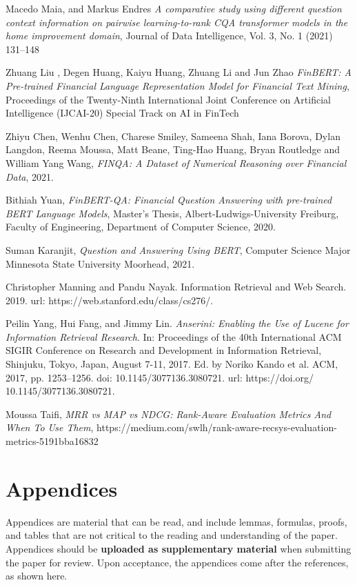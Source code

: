 \documentclass[11pt,a4paper]{article}
\begin{document}
\begin{thebibliography}{}

 Macedo Maia, and Markus Endres \emph{A comparative study using different question context information on pairwise learning-to-rank CQA transformer models in the home improvement domain}, Journal of Data Intelligence, Vol. 3, No. 1 (2021) 131–148

 Zhuang Liu , Degen Huang, Kaiyu Huang, Zhuang Li and Jun Zhao \emph{FinBERT: A Pre-trained Financial Language Representation Model for Financial Text Mining}, Proceedings of the Twenty-Ninth International Joint Conference on Artificial Intelligence (IJCAI-20) Special Track on AI in FinTech

 Zhiyu Chen, Wenhu Chen, Charese Smiley, Sameena Shah, Iana Borova, Dylan Langdon, Reema Moussa, Matt Beane, Ting-Hao Huang, Bryan Routledge and William Yang Wang, \emph{FINQA: A Dataset of Numerical Reasoning over Financial Data}, 2021.

 Bithiah Yuan, \emph{FinBERT-QA: Financial Question Answering with pre-trained BERT Language Models}, Master’s Thesis, Albert-Ludwigs-University Freiburg, Faculty of Engineering, Department of Computer Science, 2020.

 Suman Karanjit, \emph{Question and Answering Using BERT}, Computer Science Major Minnesota State University Moorhead, 2021.

 Christopher Manning and Pandu Nayak. Information Retrieval and Web Search. 2019. url: https://web.stanford.edu/class/cs276/.

 Peilin Yang, Hui Fang, and Jimmy Lin. \emph{Anserini: Enabling the Use of Lucene for Information Retrieval Research}. In: Proceedings of the 40th International ACM SIGIR Conference on Research and Development in Information Retrieval, Shinjuku, Tokyo, Japan, August 7-11, 2017. Ed. by Noriko Kando et al. ACM, 2017, pp. 1253–1256. doi: 10.1145/3077136.3080721. url: https://doi.org/ 10.1145/3077136.3080721.

 Moussa Taifi, \emph{MRR vs MAP vs NDCG: Rank-Aware Evaluation Metrics And When To Use Them}, https://medium.com/swlh/rank-aware-recsys-evaluation-metrics-5191bba16832

\end{thebibliography}



\appendix

\section{Appendices}
\label{sec:appendix}
Appendices are material that can be read, and include lemmas, formulas, proofs, and tables that are not critical to the reading and understanding of the paper. 
Appendices should be \textbf{uploaded as supplementary material} when submitting the paper for review.
Upon acceptance, the appendices come after the references, as shown here.
\end{document}
